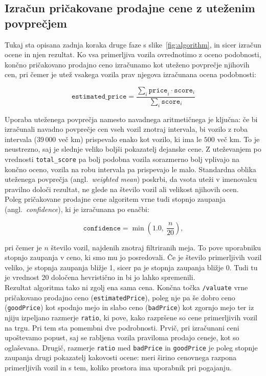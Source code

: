\documentclass[a4paper,12pt,openright]{book}
\begin{document}
\subsection{Izračun pričakovane prodajne cene z uteženim povprečjem}
\label{subsec:uteceno-povprecje}
Tukaj sta opisana zadnja koraka druge faze s slike~\ref{fig:algorithm}, in sicer
izračun ocene in njen rezultat.
Ko vsa primerljiva vozila ovrednotimo z oceno podobnosti, končno pričakovano prodajno ceno
izračunamo kot uteženo povprečje njihovih cen, pri čemer je utež vsakega vozila
prav njegova izračunana ocena podobnosti:

\begin{equation}
  \label{eq:weighted-mean}
  \texttt{estimated\_price} =
  \frac{\sum_i \texttt{price}_i \cdot \texttt{score}_i}{\sum_i \texttt{score}_i}
\end{equation}

Uporaba uteženega povprečja namesto navadnega aritmetičnega je ključna: če bi
izračunali navadno povprečje cen vseh vozil znotraj intervala, bi vozilo z roba intervala
($39\,000$ več km) prispevalo enako kot vozilo, ki ima le $500$ več km. To
je neustrezno, saj je slednje veliko boljši pokazatelj dejanske cene. Z
uteževanjem po vrednosti \texttt{total\_score} pa bolj podobna vozila sorazmerno
bolj vplivajo na končno oceno, vozila na robu intervala pa prispevajo le malo.
Standardna oblika uteženega povprečja (angl.\ \emph{weighted
mean}) poskrbi, da vsota uteži v imenovalcu pravilno
določi rezultat, ne glede na število vozil ali velikost njihovih ocen.\\
Poleg pričakovane prodajne cene algoritem vrne tudi stopnjo zaupanja (angl.\
\emph{confidence}), ki je izračunana po enačbi:

\begin{equation}
  \label{eq:confidence}
  \texttt{confidence} = \min\!\left(1{.}0,\ \frac{n}{20}\right),
\end{equation}

pri čemer je $n$ število vozil, najdenih znotraj filtriranih meja. To pove
uporabniku stopnjo zaupanja v ceno, ki smo mu jo posredovali. Če je število
primerljivih vozil veliko, je stopnja zaupanja bližje 1, sicer pa
je stopnja zaupanja bližje 0. Tudi tu je vrednost 20 določena hevristično in bi jo lahko spremenili.\\
Rezultat algoritma tako ni zgolj ena sama cena. Končna točka \texttt{/valuate} vrne
pričakovano prodajno ceno (\texttt{estimatedPrice}), poleg nje pa še dobro ceno
(\texttt{goodPrice}) kot spodnjo mejo in slabo ceno (\texttt{badPrice}) kot zgornjo mejo ter iz
njiju izpeljano razmerje \texttt{ratio}, ki pove, kako razpršene so cene
primerljivih vozil na trgu. Pri tem sta pomembni dve podrobnosti. Prvič, pri
izračunani ceni upoštevamo popust, saj se rabljena vozila praviloma prodajo
ceneje, kot so oglaševana. Drugič, razmerje
\texttt{ratio} med \texttt{badPrice} in \texttt{goodPrice} je poleg stopnje
zaupanja drugi pokazatelj kakovosti ocene: meri širino cenovnega razpona
primerljivih vozil in s tem, koliko prostora ima uporabnik pri
pogajanju.
\end{document}
